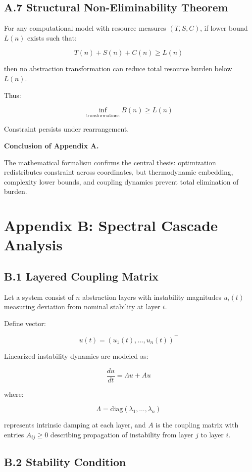 \documentclass[11pt,openany]{book}
\begin{document}
\subsection{A.7 Structural Non-Eliminability Theorem}

For any computational model with resource measures $(T,S,C)$,
if lower bound $L(n)$ exists such that:

\[
T(n) + S(n) + C(n) \ge L(n)
\]

then no abstraction transformation can reduce total resource burden below $L(n)$.

Thus:

\[
\inf_{\text{transformations}} B(n) \ge L(n)
\]

Constraint persists under rearrangement.

\bigskip

\textbf{Conclusion of Appendix A.}

The mathematical formalism confirms the central thesis: 
optimization redistributes constraint across coordinates, 
but thermodynamic embedding, complexity lower bounds, 
and coupling dynamics prevent total elimination of burden.

\section{Appendix B: Spectral Cascade Analysis}

\subsection{B.1 Layered Coupling Matrix}

Let a system consist of $n$ abstraction layers with instability magnitudes 
$u_i(t)$ measuring deviation from nominal stability at layer $i$.

Define vector:

\[
u(t) = (u_1(t), \dots, u_n(t))^\top
\]

Linearized instability dynamics are modeled as:

\[
\frac{du}{dt} = \Lambda u + A u
\]

where:

\[
\Lambda = \mathrm{diag}(\lambda_1, \dots, \lambda_n)
\]

represents intrinsic damping at each layer, and $A$ is the coupling matrix 
with entries $A_{ij} \ge 0$ describing propagation of instability 
from layer $j$ to layer $i$.

\subsection{B.2 Stability Condition}
\end{document}
